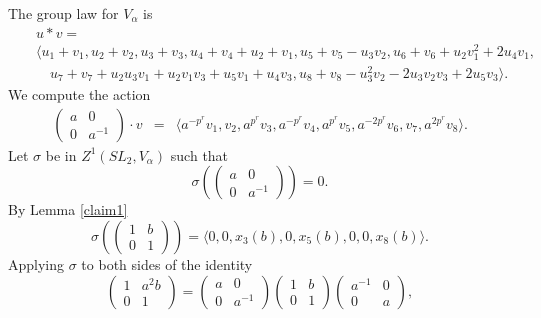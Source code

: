 \begin{example}
	The group law for $V_\alpha$ is
	\begin{eqnarray*}
		&&u * v =\\
		&&\langle
		u_1 + v_1,
		u_2 + v_2,
		u_3 + v_3,
		u_4 + v_4 + u_2 + v_1,
		u_5 + v_5 - u_3v_2,
		u_6 + v_6 + u_2v_1^2 + 2u_4v_1,\\
		&&\quad u_7 + v_7 + u_2u_3v_1 + u_2v_1v_3 + u_5v_1 + u_4v_3,
		u_8 + v_8 - u_3^2v_2 - 2u_3v_2v_3 + 2u_5v_3
		\rangle.
	\end{eqnarray*}
	We compute the action
	\begin{eqnarray*}
		\left(\begin{matrix} a & 0 \\ 0 & a^{-1} \end{matrix}\right)\cdot v
		&=&
		\langle 
		a^{-p^r}v_1,
		v_2,
		a^{p^r}v_3,
		a^{-p^r}v_4,
		a^{p^r}v_5,
		a^{-2p^r}v_6,
		v_7,
		a^{2p^r}v_8
		\rangle.
	\end{eqnarray*}
	Let $\sigma$ be in $Z^1(SL_2, V_\alpha)$ such that
	\begin{displaymath}
		\sigma\left(\left(\begin{matrix}a & 0\\0 & a^{-1}\end{matrix}\right)\right) = 0.
	\end{displaymath}
	By Lemma \ref{claim1}
	\begin{displaymath}
		\sigma\left(\left(\begin{matrix} 1 & b \\ 0 & 1 \end{matrix}\right)\right) =
		\langle 
		0,
		0,
		x_3(b),
		0,
		x_5(b),
		0,
		0,
		x_8(b)
		\rangle.
	\end{displaymath}
	Applying $\sigma$ to both sides of the identity
	\begin{displaymath}
		\left(\begin{matrix} 1 & a^2b \\ 0 & 1 \end{matrix}\right)
		= 
		\left(\begin{matrix} a & 0 \\ 0 & a^{-1} \end{matrix}\right)
		\left(\begin{matrix} 1 & b \\ 0 & 1 \end{matrix}\right)
		\left(\begin{matrix} a^{-1} & 0 \\ 0 & a \end{matrix}\right),
	\end{displaymath}

\end{example}
